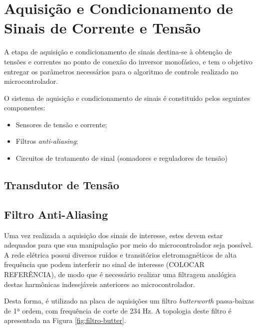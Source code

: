 \section{Aquisição e Condicionamento de Sinais de Corrente e Tensão}

A etapa de aquisição e condicionamento de sinais destina-se à obtenção de tensões e correntes no ponto de conexão do inversor monofásico, e tem o objetivo entregar os parâmetros necessários para o algoritmo de controle realizado no microcontrolador. 

O sistema de aquisição e condicionamento de sinais é constituído pelos seguintes componentes:

\begin{itemize}
	\item Sensores de tensão e corrente;
	\item Filtros \textit{anti-aliasing};
	\item Circuitos de tratamento de sinal (somadores e reguladores de tensão)
\end{itemize}

\subsection{Transdutor de Tensão}

\subsection{Filtro Anti-Aliasing}

	Uma vez realizada a aquisição dos sinais de interesse, estes devem estar adequados para que sua manipulação por meio do microcontrolador seja possível. A rede elétrica possui diversos ruídos e transitórios eletromagnéticos de alta frequência que podem interferir no sinal de interesse (COLOCAR REFERÊNCIA), de modo que é necessário realizar uma filtragem analógica destas harmônicas indesejáveis anteriores ao microcontrolador.
	
	Desta forma, é utilizado na placa de aquisições um filtro \textit{butterworth} passa-baixas de 1ª ordem, com frequência de corte de 234 Hz. A topologia deste filtro é apresentada na Figura \ref{fig:filtro-butter}.
	
